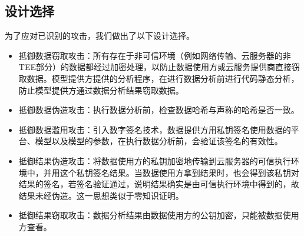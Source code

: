 \subsection{设计选择}\label{subsec:designchoice}
为了应对已识别的攻击，我们做出了以下设计选择。
\begin{itemize}
    \item 抵御数据窃取攻击：所有存在于非可信环境（例如网络传输、云服务器的非TEE部分）的数据都经过加密处理，以防止数据使用方或云服务提供商直接窃取数据。模型提供方提供的分析程序，在进行数据分析前进行代码静态分析，防止模型提供方通过数据分析结果窃取数据。
    \item 抵御数据伪造攻击：执行数据分析前，检查数据哈希与声称的哈希是否一致。
    \item 抵御数据滥用攻击：引入数字签名技术，数据提供方用私钥签名使用数据的平台、模型以及模型的参数，在执行数据分析前，会验证该签名的有效性。
    \item 抵御结果伪造攻击：将数据使用方的私钥加密地传输到云服务器的可信执行环境中，并用这个私钥签名结果。当数据使用方拿到结果时，也会得到该私钥对结果的签名，若签名验证通过，说明结果确实是由可信执行环境中得到的，故结果未经伪造。这一思想类似于零知识证明。
    \item 抵御结果窃取攻击：数据分析结果由数据使用方的公钥加密，只能被数据使用方查看。
\end{itemize} 